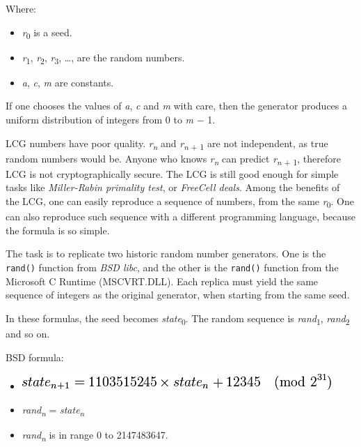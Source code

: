\begin{itemize}
Where:

\begin{itemize}
\item
  \emph{r}\textsubscript{0} is a seed.
\item
  \emph{r}\textsubscript{1}, \emph{r}\textsubscript{2},
  \emph{r}\textsubscript{3}, \ldots{}, are the random numbers.
\item
  \emph{a}, \emph{c}, \emph{m} are constants.
\end{itemize}

If one chooses the values of \emph{a}, \emph{c} and \emph{m} with care,
then the generator produces a uniform distribution of integers from 0 to
\emph{m} − 1.

LCG numbers have poor quality. \emph{r}\textsubscript{\emph{n}} and
\emph{r}\textsubscript{\emph{n} + 1} are not independent, as true random
numbers would be. Anyone who knows \emph{r}\textsubscript{\emph{n}} can
predict \emph{r}\textsubscript{\emph{n} + 1}, therefore LCG is not
cryptographically secure. The LCG is still good enough for simple tasks
like \emph{Miller-Rabin primality
test}, or \emph{FreeCell deals}. Among
the benefits of the LCG, one can easily reproduce a sequence of numbers,
from the same \emph{r}\textsubscript{0}. One can also reproduce such
sequence with a different programming language, because the formula is
so simple.

The task is to replicate two historic random number generators. One is
the \texttt{rand()} function from \emph{BSD
libc}, and the other is the \texttt{rand()} function from the Microsoft
C Runtime (MSCVRT.DLL). Each replica must yield the same sequence of
integers as the original generator, when starting from the same seed.

In these formulas, the seed becomes
\emph{s}\emph{t}\emph{a}\emph{t}\emph{e}\textsubscript{0}. The random
sequence is \emph{r}\emph{a}\emph{n}\emph{d}\textsubscript{1},
\emph{r}\emph{a}\emph{n}\emph{d}\textsubscript{2} and so on.

BSD formula:

\begin{itemize}
\item
  \includegraphics[scale=.6]{graphics/8c943c1cc7df75afeddd50d9ad93e28e.png}
\item
  \emph{r}\emph{a}\emph{n}\emph{d}\textsubscript{\emph{n}} =
  \emph{s}\emph{t}\emph{a}\emph{t}\emph{e}\textsubscript{\emph{n}}
\item
  \emph{r}\emph{a}\emph{n}\emph{d}\textsubscript{\emph{n}} is in range 0
  to 2147483647.
\end{itemize}


\end{itemize}
